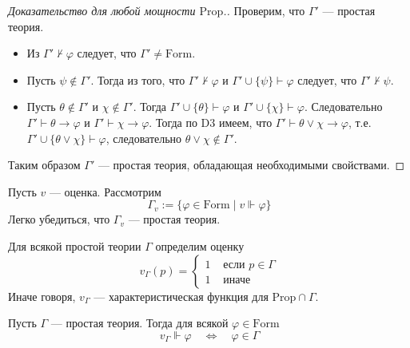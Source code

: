 \documentclass[12pt,a4paper]{article}
\newcommand{\Prop}{\ensuremath{\mathrm{Prop}}\xspace}
\newcommand{\Formul}{\ensuremath{\mathrm{Form}}\xspace}
\begin{document}
\begin{proof}[Доказательство для любой мощности $\Prop$.]
        Проверим, что $\Gamma'$ --- простая теория.
        \begin{itemize}
            \item Из $\Gamma' \nvdash \varphi$ следует, что $\Gamma' \neq \Formul$.
            \item Пусть $\psi \notin \Gamma'$. Тогда из того, что $\Gamma' \nvdash \varphi$ и $\Gamma' \cup \{\psi\} \vdash \varphi$ следует, что $\Gamma' \nvdash \psi$.
            \item Пусть $\theta \notin \Gamma'$ и $\chi \notin \Gamma'$. Тогда $\Gamma' \cup \{\theta\} \vdash \varphi$ и $\Gamma' \cup \{\chi\} \vdash \varphi$. Следовательно $\Gamma' \vdash \theta \rightarrow \varphi$ и $\Gamma' \vdash \chi \rightarrow \varphi$. Тогда по $\mathrm{D3}$ имеем, что $\Gamma' \vdash \theta \vee \chi \rightarrow \varphi$, т.е. $\Gamma' \cup \{\theta \vee \chi\} \vdash \varphi$, следовательно $\theta \vee \chi \notin \Gamma'$.
        \end{itemize}

        Таким образом $\Gamma'$ --- простая теория, обладающая необходимыми свойствами.
    \end{proof}

    \begin{example}
        Пусть $v$ --- оценка. Рассмотрим
        \[\Gamma_v := \{\varphi \in \Formul \mid v \Vdash \varphi\}\]
        Легко убедиться, что $\Gamma_v$ --- простая теория.
    \end{example}

    \begin{definition}
        Для всякой простой теории $\Gamma$ определим оценку
        \[
            v_\Gamma(p) =
            \begin{cases}
                1& \text{ если $p \in \Gamma$}\\
                1& \text{ иначе}
            \end{cases}
        \]
        Иначе говоря, $v_\Gamma$ --- характеристическая функция для $\Prop \cap \Gamma$.
    \end{definition}

    \begin{lemma}
        Пусть $\Gamma$ --- простая теория. Тогда для всякой $\varphi \in \Formul$
        \[v_\Gamma \Vdash \varphi \quad \Longleftrightarrow \quad \varphi \in \Gamma\]
    \end{lemma}
\end{document}
